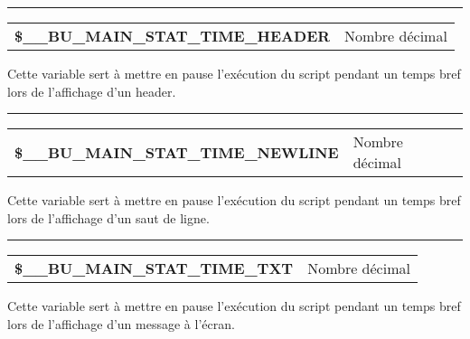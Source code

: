 \documentclass[a4paper,10pt]{article}
\begin{document}

    \par\noindent\rule{\textwidth}{0.4pt}

    \begin{justify}
        \begin{tabular}{l|l}
            \textbf{\color{vars}\$\_\_BU\_MAIN\_STAT\_TIME\_HEADER}   & Nombre décimal\\[1\baselineskip]
        \end{tabular}
    \end{justify}

    \begin{justify}
        Cette variable sert à mettre en pause l'exécution du script pendant un temps bref lors de l'affichage d'un header.
    \end{justify}


    \par\noindent\rule{\textwidth}{0.4pt}

    \begin{justify}
        \begin{tabular}{l|l}
            \textbf{\color{vars}\$\_\_BU\_MAIN\_STAT\_TIME\_NEWLINE}  & Nombre décimal\\[1\baselineskip]
        \end{tabular}
    \end{justify}

    \begin{justify}
        Cette variable sert à mettre en pause l'exécution du script pendant un temps bref lors de l'affichage d'un saut de ligne.
    \end{justify}


    \par\noindent\rule{\textwidth}{0.4pt}

    \begin{justify}
        \begin{tabular}{l|l}
            \textbf{\color{vars}\$\_\_BU\_MAIN\_STAT\_TIME\_TXT}  & Nombre décimal\\[1\baselineskip]
        \end{tabular}
    \end{justify}

    \begin{justify}
        Cette variable sert à mettre en pause l'exécution du script pendant un temps bref lors de l'affichage d'un message à l'écran.
    \end{justify}
\end{document}
